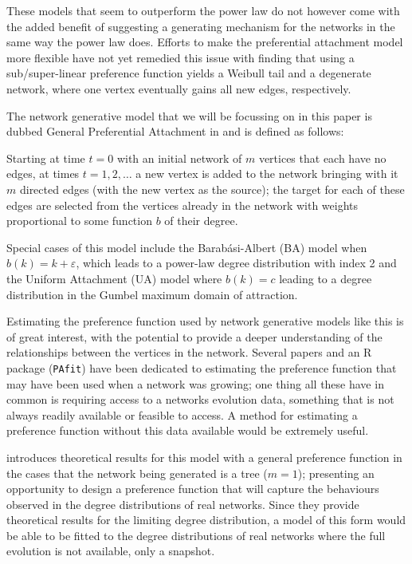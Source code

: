 \documentclass[
  sn-basic,
]{sn-jnl}
\theoremstyle{plain}
\theoremstyle{remark}
\begin{document}
These models that seem to outperform the power law do not however come
with the added benefit of suggesting a generating mechanism for the
networks in the same way the power law does. Efforts to make the
preferential attachment model more flexible have not yet remedied this
issue with \citet{krapivsky01} finding that using a sub/super-linear
preference function yields a Weibull tail and a degenerate network,
where one vertex eventually gains all new edges, respectively.

The network generative model that we will be focussing on in this paper
is dubbed General Preferential Attachment in \citet{rudas07} and is
defined as follows:

Starting at time \(t=0\) with an initial network of \(m\) vertices that
each have no edges, at times \(t=1,2,\ldots\) a new vertex is added to
the network bringing with it \(m\) directed edges (with the new vertex
as the source); the target for each of these edges are selected from the
vertices already in the network with weights proportional to some
function \(b\) of their degree.

Special cases of this model include the Barabási-Albert (BA) model when
\(b(k) = k+\varepsilon\), which leads to a power-law degree distribution
with index 2 and the Uniform Attachment (UA) model where \(b(k)=c\)
leading to a degree distribution in the Gumbel maximum domain of
attraction.

Estimating the preference function used by network generative models
like this is of great interest, with the potential to provide a deeper
understanding of the relationships between the vertices in the network.
Several papers and an R package (\texttt{PAfit}) have been dedicated to
estimating the preference function that may have been used when a
network was growing; one thing all these have in common is requiring
access to a networks evolution data, something that is not always
readily available or feasible to access. A method for estimating a
preference function without this data available would be extremely
useful.

\citet{rudas07} introduces theoretical results for this model with a
general preference function in the cases that the network being
generated is a tree (\(m=1\)); presenting an opportunity to design a
preference function that will capture the behaviours observed in the
degree distributions of real networks. Since they provide theoretical
results for the limiting degree distribution, a model of this form would
be able to be fitted to the degree distributions of real networks where
the full evolution is not available, only a snapshot.
\end{document}
